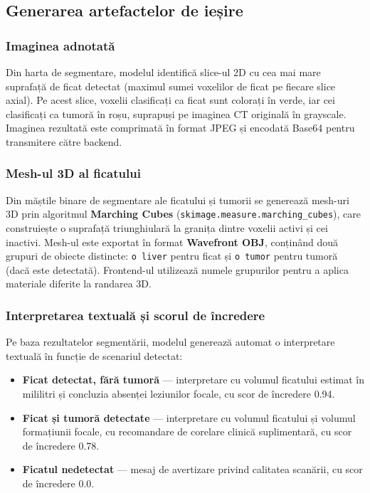 \documentclass[12pt, a4paper]{report}
\begin{document}
\subsection{Generarea artefactelor de ieșire}

\subsubsection{Imaginea adnotată}

Din harta de segmentare, modelul identifică slice-ul 2D cu cea mai mare suprafață
de ficat detectat (maximul sumei voxelilor de ficat pe fiecare slice axial).
Pe acest slice, voxelii clasificați ca ficat sunt colorați în verde, iar cei
clasificați ca tumoră în roșu, suprapuși pe imaginea CT originală în grayscale.
Imaginea rezultată este comprimată în format JPEG și encodată Base64 pentru
transmitere către backend.

\subsubsection{Mesh-ul 3D al ficatului}

Din măștile binare de segmentare ale ficatului și tumorii se generează mesh-uri
3D prin algoritmul \textbf{Marching Cubes} (\texttt{skimage.measure.marching\_cubes}),
care construiește o suprafață triunghiulară la granița dintre voxelii activi și
cei inactivi. Mesh-ul este exportat în format \textbf{Wavefront OBJ}, conținând
două grupuri de obiecte distincte: \texttt{o liver} pentru ficat și
\texttt{o tumor} pentru tumoră (dacă este detectată). Frontend-ul utilizează
numele grupurilor pentru a aplica materiale diferite la randarea 3D.

\subsubsection{Interpretarea textuală și scorul de încredere}

Pe baza rezultatelor segmentării, modelul generează automat o interpretare textuală
în funcție de scenariul detectat:

\begin{itemize}
    \item \textbf{Ficat detectat, fără tumoră} --- interpretare cu volumul
          ficatului estimat în mililitri și concluzia absenței leziunilor focale,
          cu scor de încredere 0.94.
    \item \textbf{Ficat și tumoră detectate} --- interpretare cu volumul ficatului
          și volumul formațiunii focale, cu recomandare de corelare clinică
          suplimentară, cu scor de încredere 0.78.
    \item \textbf{Ficatul nedetectat} --- mesaj de avertizare privind calitatea
          scanării, cu scor de încredere 0.0.
\end{itemize}
\end{document}
